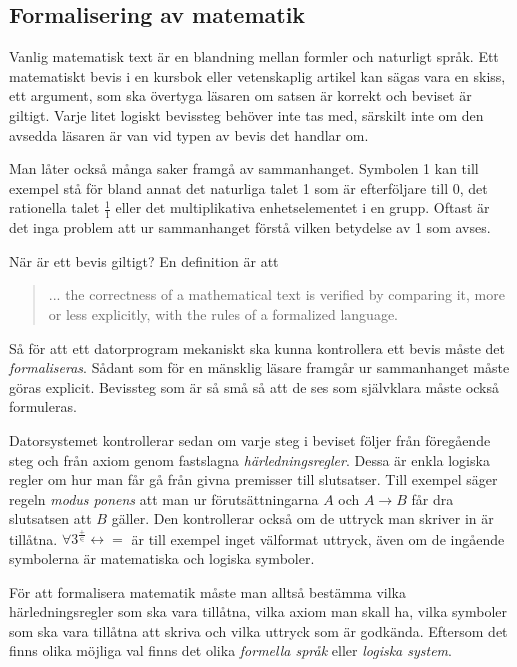 \subsection{Formalisering av matematik}
Vanlig matematisk text är en blandning mellan formler och naturligt språk. Ett
matematiskt bevis i en kursbok eller vetenskaplig artikel kan sägas vara en
skiss, ett argument, som ska övertyga läsaren om satsen är korrekt och beviset
är giltigt. Varje litet logiskt bevissteg behöver inte tas med, särskilt inte
om den avsedda läsaren är van vid typen av bevis det handlar om.

Man låter också många saker framgå av sammanhanget. Symbolen 1 kan till exempel
stå för bland annat det naturliga talet 1 som är efterföljare till 0, det
rationella talet $\frac{1}{1}$ eller det multiplikativa enhetselementet i en
grupp. Oftast är det inga problem att ur sammanhanget förstå vilken betydelse
av 1 som avses.

När är ett bevis giltigt? En definition är att
\begin{quote}
... the correctness of a mathematical text is verified by comparing it, more or
less explicitly, with the rules of a formalized language\cite{bourbaki}.
\end{quote}

Så för att ett datorprogram mekaniskt ska kunna kontrollera ett bevis måste det
\emph{formaliseras}. Sådant som för en mänsklig läsare framgår ur sammanhanget
måste göras explicit. Bevissteg som är så små så att de ses som självklara
måste också formuleras.

Datorsystemet kontrollerar sedan om varje steg i beviset följer från föregående
steg och från axiom genom fastslagna \emph{härledningsregler}. Dessa är enkla
logiska regler om hur man får gå från givna premisser till slutsatser. Till
exempel säger regeln \emph{modus ponens} att man ur förutsättningarna $A$ och
$A \to B$ får dra slutsatsen att $B$ gäller. Den kontrollerar också om de
uttryck man skriver in är tillåtna.
$\forall 3^{\frac{+}{\in}} \leftrightarrow =$ är till exempel inget välformat
uttryck, även om de ingående symbolerna är matematiska och logiska symboler.

För att formalisera matematik måste man alltså bestämma vilka härledningsregler
som ska vara tillåtna, vilka axiom man skall ha, vilka symboler som ska vara
tillåtna att skriva och vilka uttryck som är godkända. Eftersom det finns olika
möjliga val finns det olika \emph{formella språk} eller \emph{logiska system}.

